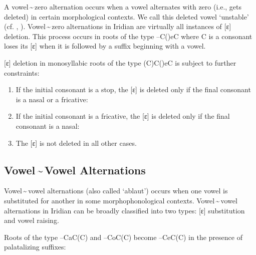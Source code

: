 A vowel\,\sim\,zero alternation occurs when a vowel alternates with zero (i.e.,
gets deleted) in certain morphological contexts. We call this deleted vowel
`unstable' (cf. \cite{siptar2000}, \cite{gussmann2007}). Vowel\,\sim\,zero
alternations in Iridian are virtually all instances of [ɛ] deletion. This
process occurs in roots of the type --C()eC where C is a consonant loses
its [ɛ] when it is followed by a suffix beginning with a vowel.

\ex
{}
\xe

[ɛ] deletion in monosyllabic roots of the type (C)C()eC is subject to
further constraints:

\begin{enumerate}
	\item If the initial consonant is a stop, the [ɛ] is deleted only if the final consonant is a nasal or a fricative:\\

	\item If the initial consonant is a fricative, the [ɛ] is deleted only if the final consonant is a nasal:\\

	\item The [ɛ] is not deleted in all other cases.
\end{enumerate}

\subsection{Vowel\,\sim\,Vowel Alternations}
Vowel\,\sim\,vowel alternations (also called `ablaut') occurs when one vowel is
substituted for another in some morphophonological contexts. Vowel\,\sim\,vowel
alternations in Iridian can be broadly classified into two types: [ɛ]
substitution and vowel raising.

Roots of the type --CaC(C) and --CoC(C) become --CeC(C) in the
presence of palatalizing suffixes:

